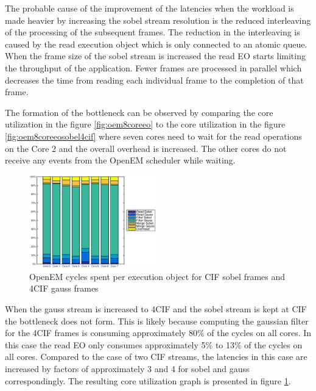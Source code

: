 The probable cause of the improvement of the latencies when the workload is made heavier by increasing the sobel stream resolution is the reduced interleaving of the processing of the subsequent frames. The reduction in the interleaving is caused by the read execution object which is only connected to an atomic queue. When the frame size of the sobel stream is increased the read EO starts limiting the throughput of the application. Fewer frames are processed in parallel which decreases the time from reading each individual frame to the completion of that frame.

The formation of the bottleneck can be observed by comparing the core utilization in the figure \ref{fig:oem8coreeo} to the core utilization in the figure \ref{fig:oem8coreeosobel4cif} where seven cores need to wait for the read operations on the Core 2 and the overall overhead is increased. The other cores do not receive any events from the OpenEM scheduler while waiting.

\begin{figure}[h]
    \begin{center}
        \includegraphics[width=0.49\textwidth]{images/openem_sobelcif_gauss4cif_eo.eps}
        \caption{OpenEM cycles spent per execution object for CIF sobel frames
        and 4CIF gauss frames}
        \label{fig:oem8coreeogauss4cif}
    \end{center}
\end{figure}

When the gauss stream is increased to 4CIF and the sobel stream is kept at CIF the bottleneck does not form. This is likely because computing the gaussian filter for the 4CIF frames is consuming approximately 80\% of the cycles on all cores. In this case the read EO only consumes approximately 5\% to 13\% of the cycles on all cores. Compared to the case of two CIF streams, the latencies in this case are increased by factors of approximately 3 and 4 for sobel and gauss correspondingly. The resulting core utilization graph is presented in figure \ref{fig:oem8coreeogauss4cif}.
\FloatBarrier
